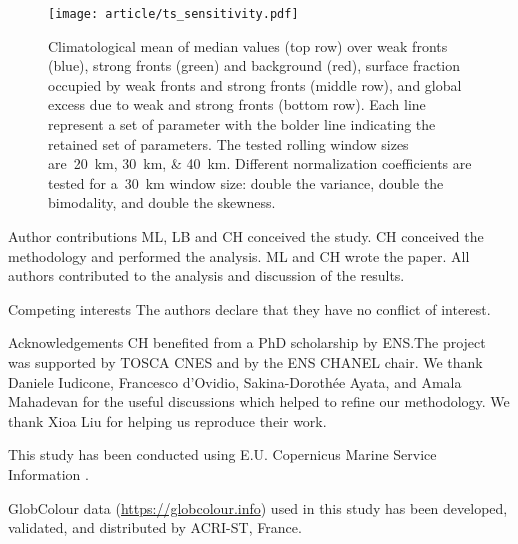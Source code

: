 
\begin{figure}
  \centering
  \texttt{[image: article/ts\_sensitivity.pdf]}
  \caption[Sensitivity of the seasonal impact of fronts on  parameters]{%
    Climatological mean of  median values (top row) over weak fronts (blue), strong fronts (green) and background (red), surface fraction occupied by weak fronts and strong fronts (middle row), and global  excess due to weak and strong fronts (bottom row).
    Each line represent a set of parameter with the bolder line indicating the retained set of parameters.
    The tested rolling window sizes are~\qtylist{20;30;40}{\km}.
    Different normalization coefficients are tested for a~\qty{30}{\km} window size: double the variance, double the bimodality, and double the skewness.
  }%
  \label{fig:ts-sensitivity}
\end{figure}


\begin{articleSubBlock}{Author contributions}
  ML, LB and CH conceived the study. CH conceived the methodology and performed the analysis. ML and CH wrote the paper. All authors contributed to the analysis and discussion of the results.
\end{articleSubBlock}


\begin{articleSubBlock}{Competing interests}
  The authors declare that they have no conflict of interest.
\end{articleSubBlock}

\begin{articleSubBlock}{Acknowledgements}
  CH benefited from a PhD scholarship by ENS.\@ The project was supported by TOSCA CNES and by the ENS CHANEL chair.
  We thank Daniele Iudicone, Francesco d'Ovidio, Sakina-Dorothée Ayata, and Amala Mahadevan for the useful discussions which helped to refine our methodology. We thank Xioa Liu for helping us reproduce their work.

  This study has been conducted using E.U. Copernicus Marine Service Information \parencite[datasets used:][]{article_chl, article_sst}.

  GlobColour data (\url{https://globcolour.info}) used in this study has been developed, validated, and distributed by ACRI-ST, France.
\end{articleSubBlock}

% 
